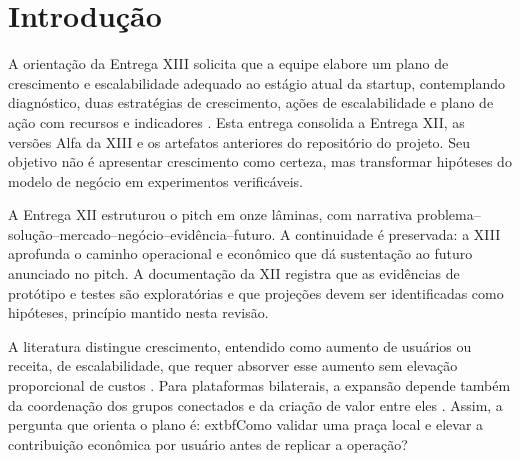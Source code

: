 \section{Introdução}
A orientação da Entrega XIII solicita que a equipe elabore um plano de crescimento e escalabilidade adequado ao estágio atual da startup, contemplando diagnóstico, duas estratégias de crescimento, ações de escalabilidade e plano de ação com recursos e indicadores \cite{pucxiii2026}. Esta entrega consolida a Entrega XII, as versões Alfa da XIII e os artefatos anteriores do repositório do projeto. Seu objetivo não é apresentar crescimento como certeza, mas transformar hipóteses do modelo de negócio em experimentos verificáveis.

A Entrega XII estruturou o pitch em onze lâminas, com narrativa problema--solução--mercado--negócio--evidência--futuro. A continuidade é preservada: a XIII aprofunda o caminho operacional e econômico que dá sustentação ao futuro anunciado no pitch. A documentação da XII registra que as evidências de protótipo e testes são exploratórias e que projeções devem ser identificadas como hipóteses, princípio mantido nesta revisão.

A literatura distingue crescimento, entendido como aumento de usuários ou receita, de escalabilidade, que requer absorver esse aumento sem elevação proporcional de custos \cite{sanasi2023,platformscaling2023}. Para plataformas bilaterais, a expansão depende também da coordenação dos grupos conectados e da criação de valor entre eles \cite{rochet2003,eisenmann2006}. Assim, a pergunta que orienta o plano é: 	extbf{Como validar uma praça local e elevar a contribuição econômica por usuário antes de replicar a operação?}